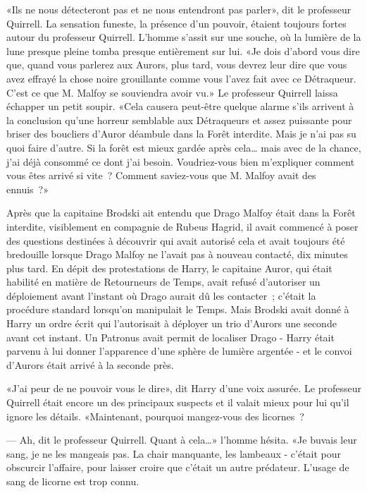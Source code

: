 «Ils ne nous détecteront pas et ne nous entendront pas parler», dit le professeur Quirrell. La sensation funeste, la présence d'un pouvoir, étaient toujours fortes autour du professeur Quirrell. L'homme s'assit sur une souche, où la lumière de la lune presque pleine tomba presque entièrement sur lui. «Je dois d'abord vous dire que, quand vous parlerez aux Aurors, plus tard, vous devrez leur dire que vous avez effrayé la chose noire grouillante comme vous l'avez fait avec ce Détraqueur. C'est ce que M. Malfoy se souviendra avoir vu.» Le professeur Quirrell laissa échapper un petit soupir. «Cela causera peut-être quelque alarme s'ils arrivent à la conclusion qu'une horreur semblable aux Détraqueurs et assez puissante pour briser des boucliers d'Auror déambule dans la Forêt interdite. Mais je n'ai pas su quoi faire d'autre. Si la forêt est mieux gardée après cela… mais avec de la chance, j'ai déjà consommé ce dont j'ai besoin. Voudriez-vous bien m'expliquer comment vous êtes arrivé si vite~? Comment saviez-vous que M. Malfoy avait des ennuis~?»

Après que la capitaine Brodski ait entendu que Drago Malfoy était dans la Forêt interdite, visiblement en compagnie de Rubeus Hagrid, il avait commencé à poser des questions destinées à découvrir qui avait autorisé cela et avait toujours été bredouille lorsque Drago Malfoy ne l'avait pas à nouveau contacté, dix minutes plus tard. En dépit des protestations de Harry, le capitaine Auror, qui était habilité en matière de Retourneurs de Temps, avait refusé d'autoriser un déploiement avant l'instant où Drago aurait dû les contacter~; c'était la procédure standard lorsqu'on manipulait le Temps. Mais Brodski avait donné à Harry un ordre écrit qui l'autorisait à déployer un trio d'Aurors une seconde avant cet instant. Un Patronus avait permit de localiser Drago - Harry était parvenu à lui donner l'apparence d'une sphère de lumière argentée - et le convoi d'Aurors était arrivé à la seconde près.

«J'ai peur de ne pouvoir vous le dire», dit Harry d'une voix assurée. Le professeur Quirrell était encore un des principaux suspects et il valait mieux pour lui qu'il ignore les détails. «Maintenant, pourquoi mangez-vous des licornes~?

--- Ah, dit le professeur Quirrell. Quant à cela…» l'homme hésita. «Je buvais leur sang, je ne les mangeais pas. La chair manquante, les lambeaux - c'était pour obscurcir l'affaire, pour laisser croire que c'était un autre prédateur. L'usage de sang de licorne est trop connu.

